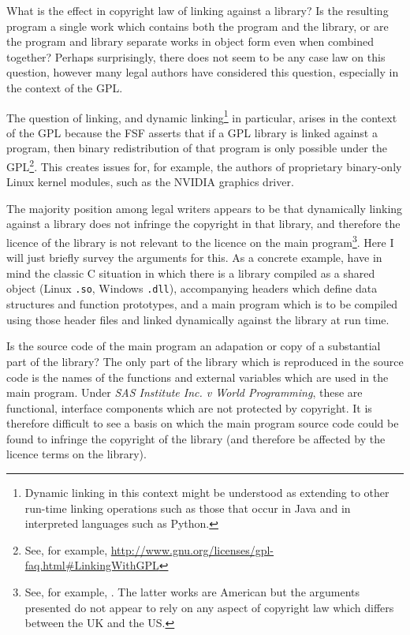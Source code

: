 \documentclass[a4paper,12pt]{article}
\begin{document}
What is the effect in copyright law of linking against a library? Is the
resulting program a single work which contains both the program and the
library, or are the program and library separate works in object form even
when combined together? Perhaps surprisingly, there does not seem to be any
case law on this question, however many legal authors have considered this
question, especially in the context of the GPL. 

The question of linking, and dynamic linking\footnote{Dynamic linking in
  this context might be understood as extending to other run-time linking
  operations such as those that occur in Java and in interpreted languages
  such as Python.} in particular, arises in the context of the GPL because
the FSF asserts that if a GPL library is linked against a program, then
binary redistribution of that program is only possible under the
GPL\footnote{See, for example,
  \url{http://www.gnu.org/licenses/gpl-faq.html\#LinkingWithGPL}}. This
creates issues for, for example, the authors of proprietary binary-only
Linux kernel modules, such as the NVIDIA graphics driver.

The majority position among legal writers appears to be that dynamically
linking against a library does not infringe the copyright in that library,
and therefore the licence of the library is not relevant to the licence on
the main program\footnote{See, for example,
  \citet{Katz2007,Rosen2004,Lindberg2008}. The latter works are American but
  the arguments presented do not appear to rely on any aspect of copyright
  law which differs between the UK and the US.}. Here I will just briefly survey
the arguments for this. As a concrete example, have in mind the
classic C situation in which there is a library compiled as a shared object
(Linux \texttt{.so}, Windows \texttt{.dll}),
accompanying headers which define data structures and function prototypes,
and a main program which is to be compiled using those header files and
linked dynamically against the library at run time. 

Is the source code of the main program an adapation or copy of a substantial part of the
library? The only part of the library which is reproduced in the source code
is the names of the functions and external variables which are used in the
main program. Under \textit{SAS Institute Inc. v World Programming}, these
are functional, interface components which are not protected by
copyright. It is therefore difficult to see a basis on which the main
program source code could be found to infringe the copyright of the library
(and therefore be affected by the licence terms on the library).
\end{document}
